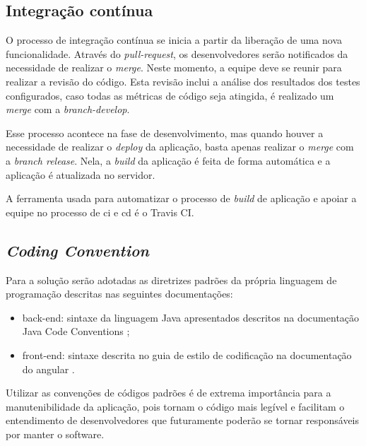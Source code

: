 \subsection{Integração contínua}
O processo de integração contínua se inicia a partir da liberação de uma nova funcionalidade. Através do \textit{\gls{pull-request}}, os desenvolvedores serão notificados da necessidade de realizar o \textit{\gls{merge}}. Neste momento, a equipe deve se reunir para realizar a revisão do código. Esta revisão inclui a análise dos resultados dos testes configurados, caso todas as métricas de código seja atingida, é realizado um \textit{\gls{merge}} com a \textit{\gls{branch-develop}}. 


Esse processo acontece na fase de desenvolvimento, mas quando houver a necessidade de realizar o \textit{\gls{deploy}} da aplicação, basta apenas realizar o \textit{merge} com a \textit{branch release}. Nela, a \textit{\gls{build}} da aplicação é feita de forma automática e a aplicação é atualizada no servidor. 


A ferramenta usada para automatizar o processo de \textit{\gls{build}} de aplicação e apoiar a equipe no processo de \ac{ci} e \ac{cd} é o Travis CI.


\subsection{\textit{Coding Convention}}
Para a solução serão adotadas as diretrizes padrões da própria linguagem de programação descritas nas seguintes documentações:

\begin{itemize}
\item \gls{back-end}: sintaxe da linguagem Java  apresentados descritos na documentação Java Code Conventions \cite{javacodeconvention:1997};
\item \gls{front-end}: sintaxe descrita no guia de estilo de codificação na documentação do angular \cite{angularstyleguide:2021}.
\end{itemize}


Utilizar as convenções de códigos padrões é de extrema importância para a manutenibilidade da aplicação, pois tornam o código mais legível e facilitam o entendimento de desenvolvedores que futuramente poderão se tornar responsáveis por manter o software.



